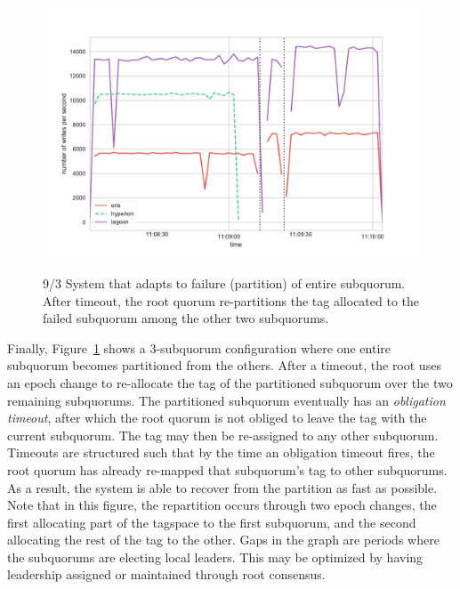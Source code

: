 \begin{figure}
    \begin{center}
        \includegraphics[width=5in]{figures/ch03_umd_fault_tolerance.pdf}
    \end{center}
    \renewcommand{\baselinestretch}{1}
    \small\normalsize

    \begin{quote}
        \caption[HC Fault Repartitioning]{9/3 System that adapts to failure (partition) of entire subquorum. After timeout, the root quorum re-partitions the tag allocated to the failed subquorum among the other two subquorums.}
        \label{fig:ch03_umd_fault_tolerance}
    \end{quote}
\end{figure}
\renewcommand{\baselinestretch}{2}
\small\normalsize

Finally, Figure~\ref{fig:ch03_umd_fault_tolerance} shows a 3-subquorum configuration where one entire subquorum becomes partitioned from the others.
After a timeout, the root uses an epoch change to re-allocate the tag of the partitioned subquorum over the two remaining subquorums.
The partitioned subquorum eventually has an \emph{obligation timeout}, after which the root quorum is not obliged to leave the tag with the current subquorum.
The tag may then be re-assigned to any other subquorum.
Timeouts are structured such that by the time an obligation timeout fires, the root quorum has already re-mapped that subquorum's tag to other subquorums.
As a result, the system is able to recover from the partition as fast as possible.
Note that in this figure, the repartition occurs through two epoch changes, the first allocating part of the tagspace to the first subquorum, and the second allocating the rest of the tag to the other.
Gaps in the graph are periods where the subquorums are electing local leaders.
This may be optimized by having leadership assigned or maintained through root consensus.

